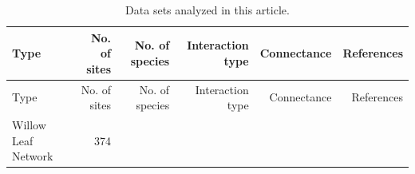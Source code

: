 \begin{longtable}[]{@{}lrrrrr@{}}
\caption{Data sets analyzed in this article.
\label{tbl:datasets}}\tabularnewline
\toprule
\begin{minipage}[b]{0.18\columnwidth}\raggedright\strut
Type\strut
\end{minipage} & \begin{minipage}[b]{0.08\columnwidth}\raggedleft\strut
No. of sites\strut
\end{minipage} & \begin{minipage}[b]{0.09\columnwidth}\raggedleft\strut
No. of species\strut
\end{minipage} & \begin{minipage}[b]{0.13\columnwidth}\raggedleft\strut
Interaction type\strut
\end{minipage} & \begin{minipage}[b]{0.08\columnwidth}\raggedleft\strut
Connectance\strut
\end{minipage} & \begin{minipage}[b]{0.27\columnwidth}\raggedleft\strut
References\strut
\end{minipage}\tabularnewline
\midrule
\endfirsthead
\toprule
\begin{minipage}[b]{0.18\columnwidth}\raggedright\strut
Type\strut
\end{minipage} & \begin{minipage}[b]{0.08\columnwidth}\raggedleft\strut
No. of sites\strut
\end{minipage} & \begin{minipage}[b]{0.09\columnwidth}\raggedleft\strut
No. of species\strut
\end{minipage} & \begin{minipage}[b]{0.13\columnwidth}\raggedleft\strut
Interaction type\strut
\end{minipage} & \begin{minipage}[b]{0.08\columnwidth}\raggedleft\strut
Connectance\strut
\end{minipage} & \begin{minipage}[b]{0.27\columnwidth}\raggedleft\strut
References\strut
\end{minipage}\tabularnewline
\midrule
\endhead
\begin{minipage}[t]{0.18\columnwidth}\raggedright\strut
Willow Leaf Network\strut
\end{minipage} & \begin{minipage}[t]{0.08\columnwidth}\raggedleft\strut
374\strut
\end{minipage} & \begin{minipage}[t]{0.09\columnwidth}\raggedleft\strut

\end{minipage}
\end{longtable}
